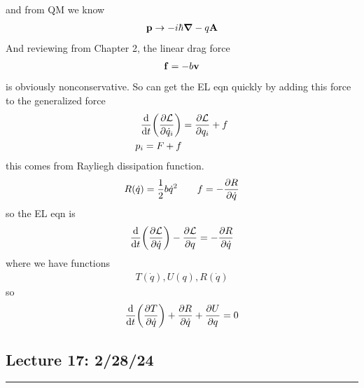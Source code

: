 \documentclass[../main.tex]{subfiles}
\begin{document}
and from QM we know
\begin{align*}
    \vb p \to -i\hbar \grad - q \vb A
\end{align*}
And reviewing from Chapter 2, the linear drag force
\begin{align*}
    \vb f = -b \vb v
\end{align*}
is obviously nonconservative. So can get the EL eqn quickly by adding this force to the generalized
force
\begin{align*}
    \dv{t}(\pdv{\mathcal{L}}{\dot q_i}) &= \pdv{\mathcal{L}}{q_i} + f \\
    p_i = F + f
\end{align*}
this comes from Rayliegh dissipation function.
\begin{align*}
    R(\dot q) = \frac{1}{2} b \dot q^2 \qquad f = - \pdv{R}{\dot q}
\end{align*}
so the EL eqn is
\begin{align*}
    \dv{t}(\pdv{\mathcal{L}}{\dot q}) - \pdv{\mathcal{L}}{q} = - \pdv{R}{\dot q}
\end{align*}
where we have functions 
\begin{align*}
    T(\dot q), U(q), R(\dot q)
\end{align*}
so
\begin{align*}
    \dv{t}(\pdv{T}{\dot q}) + \pdv{R}{\dot q} + \pdv{U}{q} = 0
\end{align*}

\newpage
\subsection*{Lecture 17: \hfill 2/28/24}
\hrule \vspace{10px}
\end{document}
